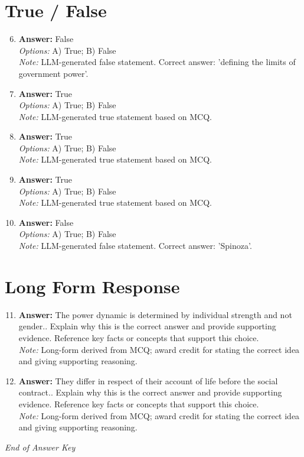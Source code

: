 \documentclass[12pt]{article}
\begin{document}
\section*{True / False}
\begin{enumerate}[label=\arabic*.]
\setcounter{enumi}{5}
\item \textbf{Answer:} False
\\ \textit{Options:} A) True; B) False
\\ \textit{Note:} LLM-generated false statement. Correct answer: 'defining the limits of government power'.
\item \textbf{Answer:} True
\\ \textit{Options:} A) True; B) False
\\ \textit{Note:} LLM-generated true statement based on MCQ.
\item \textbf{Answer:} True
\\ \textit{Options:} A) True; B) False
\\ \textit{Note:} LLM-generated true statement based on MCQ.
\item \textbf{Answer:} True
\\ \textit{Options:} A) True; B) False
\\ \textit{Note:} LLM-generated true statement based on MCQ.
\item \textbf{Answer:} False
\\ \textit{Options:} A) True; B) False
\\ \textit{Note:} LLM-generated false statement. Correct answer: 'Spinoza'.
\end{enumerate}

\section*{Long Form Response}
\begin{enumerate}[label=\arabic*.]
\setcounter{enumi}{10}
\item \textbf{Answer:} The power dynamic is determined by individual strength and not gender.. Explain why this is the correct answer and provide supporting evidence. Reference key facts or concepts that support this choice.
\\ \textit{Note:} Long-form derived from MCQ; award credit for stating the correct idea and giving supporting reasoning.
\item \textbf{Answer:} They differ in respect of their account of life before the social contract.. Explain why this is the correct answer and provide supporting evidence. Reference key facts or concepts that support this choice.
\\ \textit{Note:} Long-form derived from MCQ; award credit for stating the correct idea and giving supporting reasoning.
\end{enumerate}

\vfill
\noindent\textit{End of Answer Key}
\end{document}
